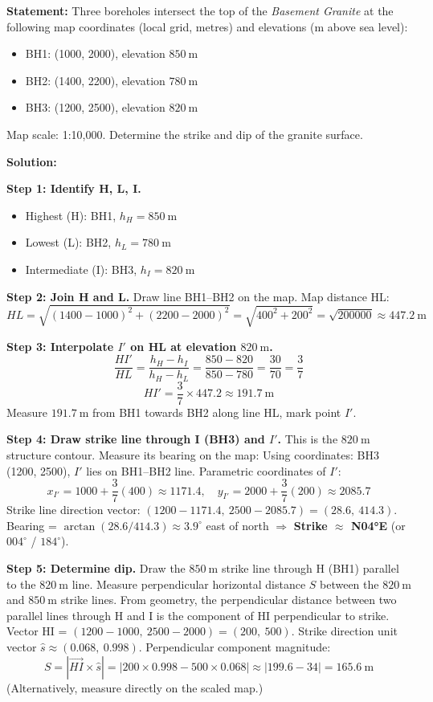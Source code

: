 \documentclass[11pt]{article}
\begin{document}
\begin{exoresolu}
\textbf{Statement:} Three boreholes intersect the top of the \emph{Basement Granite} at the following map coordinates (local grid, metres) and elevations (m above sea level):
\begin{itemize}
\item BH1: (1000, 2000), elevation $850\ \mathrm{m}$
\item BH2: (1400, 2200), elevation $780\ \mathrm{m}$
\item BH3: (1200, 2500), elevation $820\ \mathrm{m}$
\end{itemize}
Map scale: 1:10,000. Determine the strike and dip of the granite surface.

\tcblower
\textbf{Solution:}

\textbf{Step 1: Identify H, L, I.}
\begin{itemize}
\item Highest (H): BH1, $h_H = 850\ \mathrm{m}$
\item Lowest (L): BH2, $h_L = 780\ \mathrm{m}$
\item Intermediate (I): BH3, $h_I = 820\ \mathrm{m}$
\end{itemize}

\textbf{Step 2: Join H and L.}
Draw line BH1–BH2 on the map. Map distance HL:
\[
HL = \sqrt{(1400-1000)^2 + (2200-2000)^2} = \sqrt{400^2 + 200^2} = \sqrt{200000} \approx 447.2\ \mathrm{m}
\]

\textbf{Step 3: Interpolate $I'$ on HL at elevation $820\ \mathrm{m}$.}
\[
\frac{HI'}{HL} = \frac{h_H - h_I}{h_H - h_L} = \frac{850-820}{850-780} = \frac{30}{70} = \frac{3}{7}
\]
\[
HI' = \frac{3}{7} \times 447.2 \approx 191.7\ \mathrm{m}
\]
Measure $191.7\ \mathrm{m}$ from BH1 towards BH2 along line HL, mark point $I'$.

\textbf{Step 4: Draw strike line through I (BH3) and $I'$.}
This is the $820\ \mathrm{m}$ structure contour. Measure its bearing on the map:
Using coordinates:
BH3 (1200, 2500), $I'$ lies on BH1–BH2 line.
Parametric coordinates of $I'$:
\[
x_{I'} = 1000 + \frac{3}{7}(400) \approx 1171.4,\quad y_{I'} = 2000 + \frac{3}{7}(200) \approx 2085.7
\]
Strike line direction vector: $(1200-1171.4,\ 2500-2085.7) = (28.6,\ 414.3)$.
Bearing = $\arctan(28.6/414.3) \approx 3.9^\circ$ east of north $\Rightarrow$ \textbf{Strike $\approx$ N04°E} (or $004^\circ$ / $184^\circ$).

\textbf{Step 5: Determine dip.}
Draw the $850\ \mathrm{m}$ strike line through H (BH1) parallel to the $820\ \mathrm{m}$ line.
Measure perpendicular horizontal distance $S$ between the $820\ \mathrm{m}$ and $850\ \mathrm{m}$ strike lines.
From geometry, the perpendicular distance between two parallel lines through H and I is the component of HI perpendicular to strike.
Vector HI = $(1200-1000,\ 2500-2000) = (200,\ 500)$.
Strike direction unit vector $\hat{s} \approx (0.068,\ 0.998)$.
Perpendicular component magnitude:
\[
S = |\vec{HI} \times \hat{s}| = |200\times0.998 - 500\times0.068| \approx |199.6 - 34| = 165.6\ \mathrm{m}
\]
(Alternatively, measure directly on the scaled map.)


\end{exoresolu}
\end{document}
